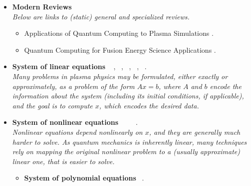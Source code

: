 \documentclass[12pt,letterpaper]{article}
\begin{document}
\begin{itemize} 

	\item \textbf{Modern Reviews}
		\\\textit{Below are links to (static) general and specialized reviews.}
		\begin{itemize} 
			\item Applications of Quantum Computing to Plasma Simulations \cite{dodinApplicationsQuantumComputing2021}.
            \item Quantum Computing for Fusion Energy Science Applications \cite{josephQuantumComputingFusion2022a}.
		\end{itemize}
    
	\item \textbf{System of linear equations}  ~\cite{huangNeartermQuantumAlgorithms2021} \cite{bravo-prietoVariationalQuantumLinear2020,xuVariationalAlgorithmsLinear2021},  ~\cite{harrowQuantumAlgorithmLinear2009,claderPreconditionedQuantumLinear2013,childsQuantumAlgorithmSystems2017,wangEfficientQuantumAlgorithms2022},  ~\cite{subasiQuantumAlgorithmsSystems2019}, ~\cite{borleHowViableQuantum2022},  ~\cite{shaoFasterQuantuminspiredAlgorithms2021}.
    \\\emph{Many problems in plasma physics may be formulated, either exactly or approximately, as a problem of the form $A x = b$, where $A$ and $b$ encode the information about the system (including its initial conditions, if applicable), and the goal is to compute $x$, which encodes the desired data.}
 
	\item \textbf{System of nonlinear equations} ~ ~\cite{dodinQuantumComputationNonlinear2021} ~\cite{xueQuantumNewtonMethod2021,xueQuantumAlgorithmSolving2022}.
    \\\emph{Nonlinear equations depend nonlinearly on $x$, and they are generally much harder to solve. As quantum mechanics is inherently linear, many techniques rely on mapping the original nonlinear problem to a (usually approximate) linear one, that is easier to solve.}
		\begin{itemize} 
			\item \textbf{System of polynomial equations}  ~\cite{changQuantumAnnealingSystems2019}.
   

\end{itemize}
\end{itemize}
\end{document}
